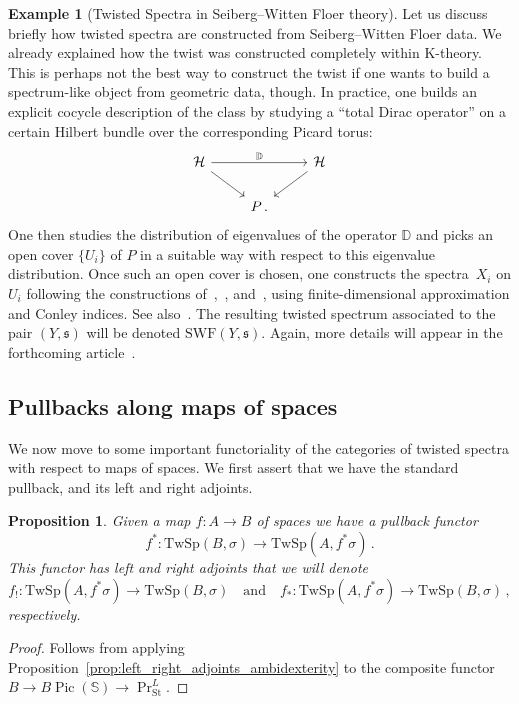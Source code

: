 \documentclass[10pt]{amsart}
\newcommand{\longto}{\longrightarrow}
\theoremstyle{plain}
\newtheorem{proposition}[theorem]{Proposition}
\theoremstyle{definition}
\newtheorem{example}[theorem]{Example}
\DeclareMathOperator{\Pic}{Pic}
\newcommand{\St}{\mathrm{St}}
\newcommand{\bS}{\mathbb{S}}
\newcommand{\TwSp}{\mathrm{TwSp}}
\newcommand{\och}{\quad \text{and} \quad}
\begin{document}
\begin{example}[Twisted Spectra in Seiberg--Witten Floer theory] \label{ex:SWF_twisted_spectrum}
  Let us discuss briefly how twisted spectra are constructed from Seiberg--Witten Floer data.
  We already explained how the twist was constructed completely within K-theory.
  This is perhaps not the best way to construct the twist if one wants to build a spectrum-like object from geometric data, though.
  In practice, one builds an explicit cocycle description of the class by studying a ``total Dirac operator''  on a certain Hilbert bundle over the corresponding Picard torus:
  \[
  \begin{tikzcd}
    \mathcal{H} \arrow[rr,"\mathbb{D}"] \arrow[rd] & & \mathcal{H} \arrow[ld] \\
    & P \,.&
  \end{tikzcd}
  \]
  One then studies the distribution of eigenvalues of the operator $\mathbb{D}$ and picks an open cover $\{U_i\}$ of $P$ in a suitable way with respect to this eigenvalue distribution.
  Once such an open cover is chosen, one constructs the spectra~$X_i$ on $U_i$ following the constructions of~\cite{Man03},~\cite{KLS}, and~\cite{SS}, using finite-dimensional approximation and Conley indices.
  See also~\cite{Kha13}.
  The resulting twisted spectrum associated to the pair $(Y,\mathfrak{s})$ will be denoted $\mathrm{SWF}(Y,\mathfrak{s})$.
  Again, more details will appear in the forthcoming article~\cite{BHK}.
\end{example}


\subsection{Pullbacks along maps of spaces} \label{sec:pullback}

We now move to some important functoriality of the categories of twisted spectra with respect to maps of spaces.
We first assert that we have the standard pullback, and its left and right adjoints.

\begin{proposition} \label{prop:functoriality_twisted_spectra}
Given a map $f : A \to B$ of spaces we have a pullback functor
\[
f^* : \TwSp(B,\sigma) \longto \TwSp(A,f^* \sigma) \,.
\]
This functor has left and right adjoints that we will denote
\[
f_! : \TwSp(A,f^* \sigma) \longto \TwSp(B,\sigma) \och f_* : \TwSp(A,f^* \sigma) \longto \TwSp(B,\sigma) \,,
\]
respectively.
\end{proposition}
\begin{proof}
  Follows from applying Proposition~\ref{prop:left_right_adjoints_ambidexterity} to the composite functor $B \to B\Pic(\bS) \to \Pr^{L}_{\St}$.
\end{proof}
\end{document}
